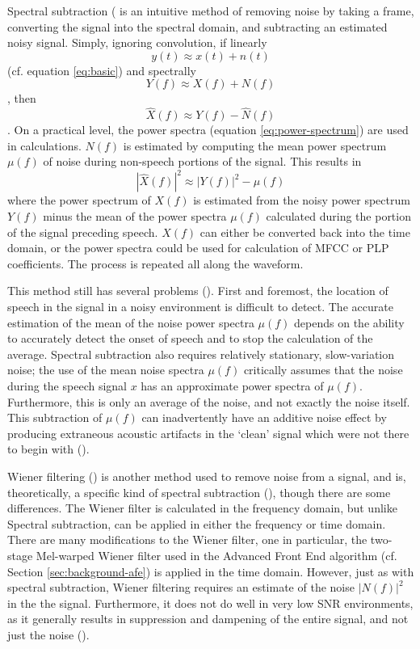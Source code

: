 Spectral subtraction (\cite{boll:79} is an intuitive method of removing noise by taking a frame, converting the signal into the spectral domain, and subtracting an estimated noisy signal. Simply, ignoring convolution, if linearly \begin{equation} y(t) \approx x(t) + n(t) \end{equation} (cf. equation \ref{eq:basic}) and spectrally \begin{equation} Y(f) \approx X(f) + N(f) \end{equation}, then \begin{equation} \hat{X}(f) \approx Y(f) - \hat{N}(f) \end{equation}.  On a practical level, the power spectra (equation \ref{eq:power-spectrum}) are used in calculations.  $N(f)$ is estimated by computing the mean power spectrum $\mu(f)$ of noise during non-speech portions of the signal.  This results in \begin{equation} |\hat{X}(f)|^2 \approx |Y(f)|^2 - \mu(f) \end{equation} where the power spectrum of $X(f)$ is estimated from the noisy power spectrum $Y(f)$ minus the mean of the power spectra $\mu(f)$ calculated during the portion of the signal preceding speech. $X(f)$ can either be converted back into the time domain, or the power spectra could be used for calculation of MFCC or PLP coefficients.  The process is repeated all along the waveform.

This method still has several problems (\cite{li:14}). First and foremost, the location of speech in the signal in a noisy environment is difficult to detect.  The accurate estimation of the mean of the noise power spectra $\mu(f)$ depends on the ability to accurately detect the onset of speech and to stop the calculation of the average.  Spectral subtraction also requires relatively stationary, slow-variation noise; the use of the mean noise spectra $\mu(f)$ critically assumes that the noise during the speech signal $x$ has an approximate power spectra of $\mu(f)$.  Furthermore, this is only an average of the noise, and not exactly the noise itself.  This subtraction of $\mu(f)$ can inadvertently have an additive noise effect by producing extraneous acoustic artifacts in the `clean' signal which were not there to begin with (\cite{berouti:79}).

Wiener filtering (\cite{lim:79}) is another method used to remove noise from a signal, and is, theoretically, a specific kind of spectral subtraction (\cite{agarwal:99}), though there are some differences. The Wiener filter is calculated in the frequency domain, but unlike Spectral subtraction, can be applied in either the frequency or time domain. There are many modifications to the Wiener filter, one in particular, the two-stage Mel-warped Wiener filter used in the Advanced Front End algorithm (cf. Section \ref{sec:background-afe}) is applied in the time domain.
However, just as with spectral subtraction, Wiener filtering requires an estimate of the noise $|N(f)|^2$ in the the signal.  Furthermore, it does not do well in very low SNR environments, as it generally results in suppression and dampening of the entire signal, and not just the noise (\cite{li:14}).


